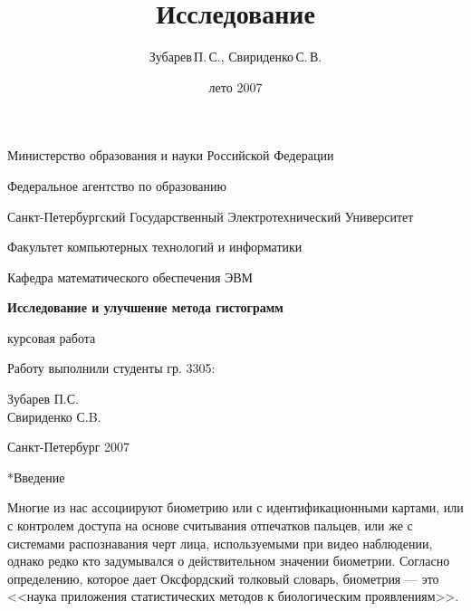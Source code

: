 \documentclass[a4paper,12pt,titlpage]{posobie}
\title{Исследование}
\author{Зубарев\,П.\,С., Свириденко\,С.\,В.}
\date{лето 2007}
\makeatletter
\renewcommand{\section}{\@startsection{section}{1}{0.0cm}{0.5cm}{0.1cm}%
             {\fontsize{16}{16}\bf\selectfont }}
\makeatother
\begin{document}
 
 \thispagestyle{empty} 
 \begin {center} 
 Министерство образования и науки Российской Федерации 
 
 Федеральное агентство по образованию 
 \vspace{0.3cm} 

 Санкт-Петербургский Государственный Электротехнический Университет 

 \vspace{0.3cm} 
 
 Факультет компьютерных технологий и информатики
 
 Кафедра математического обеспечения ЭВМ
 
 
 \vspace {100mm} 
 
 {\Large \bf Исследование и улучшение метода гистограмм} 
 

 \vspace {5mm} 
 курсовая  работа


 \vspace {25mm} 
 

 {\raggedleft 
 

 \vspace {10mm}


 Работу выполнили студенты гр. 3305: 

 Зубарев П.С.\\

 Свириденко С.B. 

   
 
 \vspace {50mm} 
 
 Санкт-Петербург 2007} 
 \end {center} 
 
\tableofcontents\thispagestyle{empty}

\pagebreak

\section*{Введение}


    Многие из нас ассоциируют биометрию или с идентификационными картами, или с контролем 
доступа на основе считывания отпечатков пальцев, или же с системами распознавания черт лица, 
используемыми при видео наблюдении, однако редко кто задумывался о действительном значении биометрии. 
Согласно определению, которое дает Оксфордский толковый словарь, биометрия --- это <<наука приложения 
статистических методов к биологическим проявлениям>>.
\end{document}
